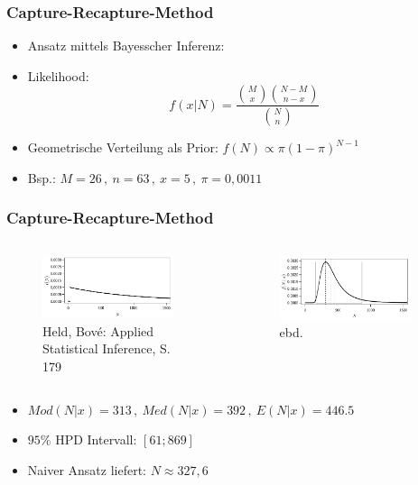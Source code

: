 \documentclass[aspectratio=169,xcolor=dvipsnames]{beamer}
\begin{document}
\begin{frame}
\frametitle{Capture-Recapture-Method}
\begin{itemize}
	\item<1-> Ansatz mittels Bayesscher Inferenz:
	\item<2-> Likelihood: $$f(x|N)=\frac{\binom{M}{x}\binom{N-M}{n-x}}{\binom{N}{n}}$$
	\item<3-> Geometrische Verteilung als Prior: $f(N)\propto \pi(1-\pi)^{N-1}$
	\item<4-> Bsp.: $M=26\, ,~n=63\, ,~x=5\, ,~\pi=0,0011$
\end{itemize}
\end{frame}

\begin{frame}
\frametitle{Capture-Recapture-Method}
\begin{columns}
	\begin{column}{0.5\textwidth}
		\begin{figure}
			\includegraphics[width=0.9\textwidth]{geom}
			\caption{Held, Bov\'{e}: Applied Statistical Inference, S. 179}
		\end{figure}
	\end{column}
	\begin{column}{0.5\textwidth}
		\begin{figure}
			\includegraphics[width=0.9\textwidth]{capture-recapture}
			\caption{ebd.}
		\end{figure}
	\end{column}
\end{columns}
\begin{itemize}
	\item<1-> $Mod(N|x)=313\, ,~Med(N|x)=392\, ,~E(N|x)=446.5$
	\item<2-> $95\%$ HPD Intervall: $[61; 869]$
	\item<3-> Naiver Ansatz liefert: $N\approx 327,6$
\end{itemize}
\end{frame}
\end{document}
